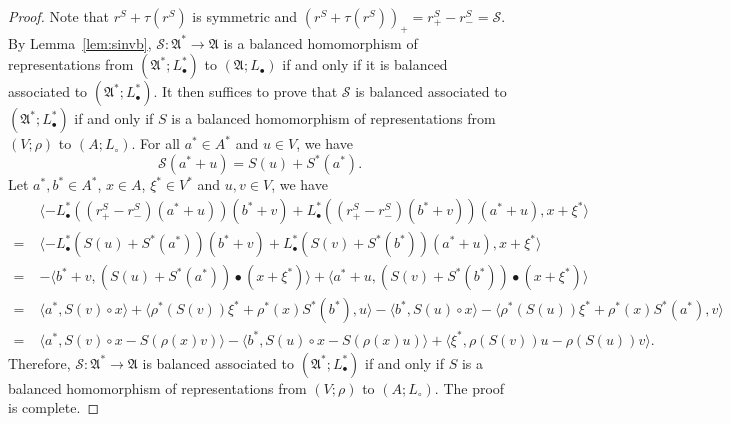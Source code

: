 \documentclass[12pt, reqno, a4paper]{amsart}
\theoremstyle{definition}
\begin{document}
\begin{proof}
	Note that $r^S + \tau(r^S)$ is symmetric and $(r^S + \tau(r^S))_{+} = r^{S}_{+} - r^{S}_{-} = \mathcal{S}$. By Lemma~\ref{lem:sinvb}, $\mathcal{S}: \mathfrak{A}^* \to \mathfrak{A}$ is a balanced homomorphism of representations from $(\mathfrak{A}^*; L_{\bullet}^*)$ to $(\mathfrak{A}; L_{\bullet})$ if and only if it is balanced associated to $(\mathfrak{A}^*; L_{\bullet}^*)$.
	It then suffices to prove that $\mathcal{S}$ is balanced associated to $(\mathfrak{A}^*; L_{\bullet}^*)$ if and only if $S$ is a balanced homomorphism of representations from $(V; \rho)$ to $(A; L_{\circ})$.
	For all $a^* \in A^*$ and $u \in V$, we have
	\begin{equation*}
		\mathcal{S}(a^* + u) = S(u) + S^*(a^*).
	\end{equation*}
	Let $a^*, b^* \in A^*$, $x \in A$, $\xi^* \in V^*$ and $u, v \in V$, we have
	\begin{align*}
		& \langle -L_{\bullet}^*((r^{S}_{+} - r^{S}_{-})(a^* + u)) (b^* + v) + L_{\bullet}^*((r^{S}_{+} - r^{S}_{-})(b^* + v)) (a^* + u), x + \xi^*\rangle \\
		=\; & \langle -L_{\bullet}^*(S(u) + S^*(a^*)) (b^* + v) + L_{\bullet}^*(S(v) + S^*(b^*)) (a^* + u), x + \xi^* \rangle                                \\
		=\; & -\langle b^* + v, (S(u) + S^*(a^*)) \bullet (x + \xi^*)\rangle + \langle a^* + u, (S(v) + S^*(b^*)) \bullet (x + \xi^*)  \rangle \\
		=\; & \langle a^*, S(v) \circ x \rangle + \langle \rho^*(S(v))\xi^* + \rho^*(x)S^*(b^*), u \rangle -\langle b^*, S(u) \circ x \rangle - \langle \rho^*(S(u))\xi^* + \rho^*(x)S^*(a^*), v \rangle \\
		=\; & \langle a^*, S(v) \circ x - S(\rho(x)v)\rangle - \langle b^*, S(u) \circ x - S(
		\rho(x)u) \rangle + \langle \xi^*, \rho(S(v))u - \rho(S(u))v \rangle.
	\end{align*}
	Therefore, $\mathcal{S}: \mathfrak{A}^* \to \mathfrak{A}$ is balanced associated to $(\mathfrak{A}^*; L_{\bullet}^*)$ if and only if $S$ is a balanced homomorphism of representations from $(V; \rho)$ to $(A; L_{\circ})$.
	The proof is complete.
\end{proof}
\end{document}
